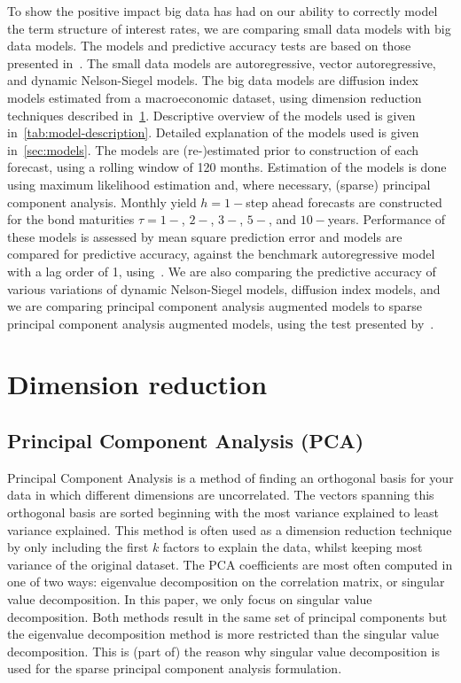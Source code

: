 To show the positive impact big data has had on our ability to correctly model the term structure of interest rates, we are comparing small data models with big data models. 
The models and predictive accuracy tests are based on those presented in~\textcite{swanson_big_2017}. 
The small data models are autoregressive, vector autoregressive, and dynamic Nelson-Siegel models. 
The big data models are diffusion index models estimated from a macroeconomic dataset, using dimension reduction techniques described in~\cref{sec:dimension-reduction}. 
Descriptive overview of the models used is given in~\cref{tab:model-description}.
Detailed explanation of the models used is given in~\cref{sec:models}.
The models are (re-)estimated prior to construction of each forecast, using a rolling window of 120 months.
Estimation of the models is done using maximum likelihood estimation and, where necessary, (sparse) principal component analysis. 
Monthly yield $h = 1-$step ahead forecasts are constructed for the bond maturities $\tau = 1-$, $2-$, $3-$, $5-$, and $10-$years. 
Performance of these models is assessed by mean square prediction error and models are compared for predictive accuracy, against the benchmark autoregressive model with a lag order of 1, using~\textcite{diebold_comparing_1994}. 
We are also comparing the predictive accuracy of various variations of dynamic Nelson-Siegel models, diffusion index models, and we are comparing principal component analysis augmented models to sparse principal component analysis augmented models, using the test presented by~\citeauthor{diebold_comparing_1994}. 

\section{Dimension reduction}
\label{sec:dimension-reduction}
\subsection{Principal Component Analysis (PCA)}
Principal Component Analysis is a method of finding an orthogonal basis for your data in which different dimensions are uncorrelated. 
The vectors spanning this orthogonal basis are sorted beginning with the most variance explained to least variance explained. 
This method is often used as a dimension reduction technique by only including the first $k$ factors to explain the data, whilst keeping most variance of the original dataset. 
The PCA coefficients are most often computed in one of two ways: eigenvalue decomposition on the correlation matrix, or singular value decomposition.
In this paper, we only focus on singular value decomposition.
Both methods result in the same set of principal components but the eigenvalue decomposition method is more restricted than the singular value decomposition. 
This is (part of) the reason why singular value decomposition is used for the sparse principal component analysis formulation.

